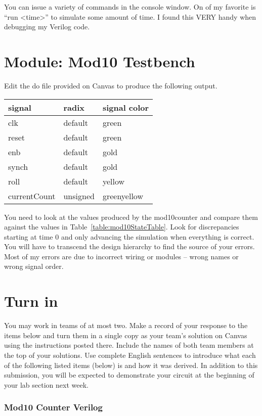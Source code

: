 You can issue a variety of commands in the console window. On of my
favorite is ``run \textless time\textgreater'' to simulate some amount
of time. I found this VERY handy when debugging my Verilog code.

\section{Module: Mod10 Testbench}

Edit the do file provided on Canvas to produce the following output.

\begin{tabular}{p{3cm}p{3cm}p{3cm}}
signal & radix & signal color \\ \hline
  clk 		& default 		& green  \\ 
  reset 	& default 		& green  \\ 
  enb 		& default 		& gold  \\ 
  synch 	& default 		& gold  \\ 
  roll 		& default 		& yellow  \\ 
  currentCount 	& unsigned & greenyellow  \\ 
\end{tabular}

You need to look at the values produced by the mod10counter and compare
them against the values in Table~\ref{table:mod10StateTable}. Look for discrepancies
starting at time 0 and only advancing the simulation when everything is
correct. You will have to transcend the design hierarchy to find the
source of your errors. Most of my errors are due to incorrect wiring or
modules -- wrong names or wrong signal order.


\section{Turn in}

You may work in teams of at most two. Make a record of your response to
the items below and turn them in a single copy as your team's solution
on Canvas using the instructions posted there. Include the names of both
team members at the top of your solutions. Use complete English
sentences to introduce what each of the following listed items (below)
is and how it was derived. In addition to this submission, you will be
expected to demonstrate your circuit at the beginning of your lab
section next week.

\subsubsection{Mod10 Counter Verilog}

